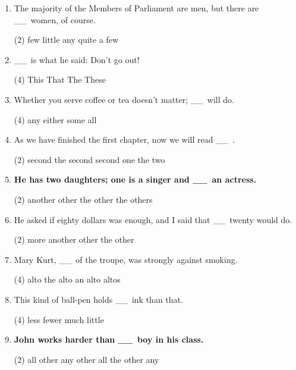 \documentclass{yufa}
\newcommand\ttu{ \_\_\ }
\begin{document}
\begin{enumerate}
\item The majority of the Members of Parliament are men, but there are  \ttu  women, of course.
  \begin{tasks}(2)
    \task few
    \task little
    \task any
    \task quite a few
  \end{tasks}

\item  \ttu  is what he said: Don't go out!
  \begin{tasks}(4)
    \task This
    \task That
    \task The
    \task These
  \end{tasks}

\item Whether you serve coffee or tea doesn't matter;  \ttu  will do.
  \begin{tasks}(4)
    \task any \task either \task some \task all
  \end{tasks}


\item As we have finished the first chapter, now we will read  \ttu .
  \begin{tasks}(2)
    \task second \task the second \task second one \task the two
  \end{tasks}

\item \textbf{He has two daughters; one is a singer and \ttu  an actress.}
  \begin{tasks}(2)
    \task another \task other
    \task the other \task the others
  \end{tasks}

\item He asked if eighty dollars was enough, and I said that  \ttu twenty would
  do.
  \begin{tasks}(2)
    \task more \task another \task other \task the other
  \end{tasks}

\item Mary Kurt, \ttu  of the troupe, was strongly against smoking.
  \begin{tasks}(4)
    \task alto \task the alto \task an alto \task altos
  \end{tasks}

\item This kind of ball-pen holds  \ttu ink than that.
  \begin{tasks}(4)
    \task less \task fewer \task much \task little
  \end{tasks}

\item \textbf{John works harder than  \ttu boy in his class.}
  \begin{tasks}(2)
    \task all other \task any other \task all the other \task any
  \end{tasks}


\end{enumerate}
\end{document}
